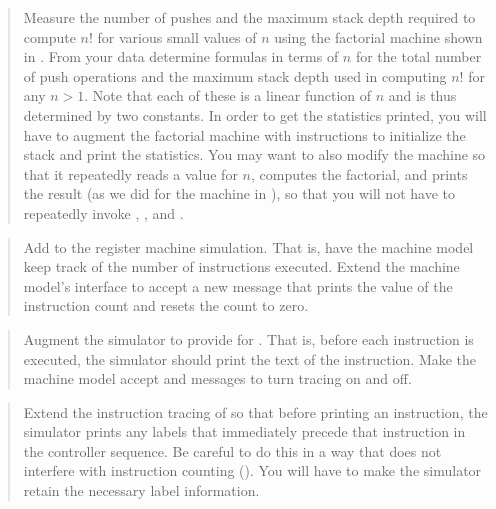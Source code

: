 \begin{quote}
 Measure the number of pushes and
the maximum stack depth required to compute \( n! \) for various small values of
\( n \) using the factorial machine shown in .  From your data
determine formulas in terms of \( n \) for the total number of push operations
and the maximum stack depth used in computing \( n! \) for any \( n > 1 \). Note
that each of these is a linear function of \( n \) and is thus determined by two
constants.  In order to get the statistics printed, you will have to augment
the factorial machine with instructions to initialize the stack and print the
statistics.  You may want to also modify the machine so that it repeatedly
reads a value for \( n \), computes the factorial, and prints the result (as we
did for the  machine in ), so that you will not
have to repeatedly invoke ,
, and .
\end{quote}

\begin{quote}
 Add  to the register machine simulation.  That is, have the machine model
keep track of the number of instructions executed.  Extend the machine model's
interface to accept a new message that prints the value of the instruction
count and resets the count to zero.
\end{quote}

\begin{quote}
 Augment the simulator to provide
for .  That is, before each instruction is
executed, the simulator should print the text of the instruction.  Make the
machine model accept  and  messages to turn
tracing on and off.
\end{quote}

\begin{quote}
 Extend the instruction tracing of
 so that before printing an instruction, the simulator
prints any labels that immediately precede that instruction in the controller
sequence.  Be careful to do this in a way that does not interfere with
instruction counting ().  You will have to make the
simulator retain the necessary label information.
\end{quote}

